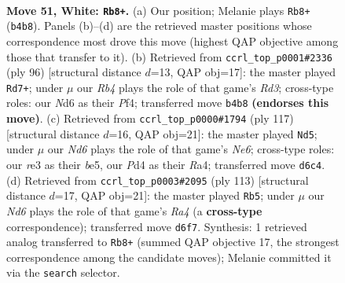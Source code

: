 \documentclass[11pt]{article}
\begin{document}
\clearpage

\begin{figure}[p]\centering
\begin{subfigure}{0.46\textwidth}\centering
\resizebox{\linewidth}{!}{%
\newchessgame
\chessboard[
  setfen={7k/6p1/3N1p2/5p1p/1R1P3P/4r1P1/6K1/8 w - - 0 51},
  showmover=false,
  pgfstyle=straightmove, color=movearrow, markmove={b4-b8}
]}
\caption{}
\end{subfigure}\hfill
\begin{subfigure}{0.46\textwidth}\centering
\resizebox{\linewidth}{!}{%
\newchessgame
\chessboard[
  setfen={8/7k/6p1/5p2/5P1p/3RP2P/r5P1/5K2 w - - 14 49},
  showmover=false,
  pgfstyle=straightmove, color=movearrow, markmove={d3-d7}
]}
\caption{}
\end{subfigure}
\\[4pt]
\begin{subfigure}{0.46\textwidth}\centering
\resizebox{\linewidth}{!}{%
\newchessgame
\chessboard[
  setfen={8/5k2/1R4p1/4B2p/r4p1P/4nP2/6PK/8 b - - 23 59},
  showmover=false,
  pgfstyle=straightmove, color=movearrow, markmove={e3-d5}
]}
\caption{}
\end{subfigure}\hfill
\begin{subfigure}{0.46\textwidth}\centering
\resizebox{\linewidth}{!}{%
\newchessgame
\chessboard[
  setfen={8/6k1/4R2p/r3p2p/4Pp2/5P2/6PK/8 b - - 7 57},
  showmover=false,
  pgfstyle=straightmove, color=movearrow, markmove={a5-b5}
]}
\caption{}
\end{subfigure}
\caption{\textbf{Move 51, White: \texttt{Rb8+}.} (a) Our position; Melanie plays \texttt{Rb8+} (\texttt{b4b8}). Panels (b)--(d) are the retrieved master positions whose correspondence most drove this move (highest QAP objective among those that transfer to it). (b) Retrieved from \texttt{ccrl\_top\_p0001\#2336} (ply 96) [structural distance $d$=13, QAP obj=17]: the master played \texttt{Rd7+}; under $\mu$ our \emph{Rb4} plays the role of that game's \emph{Rd3}; cross-type roles: our \emph{N}d6 as their \emph{P}f4; transferred move \texttt{b4b8} \textbf{(endorses this move)}. (c) Retrieved from \texttt{ccrl\_top\_p0000\#1794} (ply 117) [structural distance $d$=16, QAP obj=21]: the master played \texttt{Nd5}; under $\mu$ our \emph{Nd6} plays the role of that game's \emph{Ne6}; cross-type roles: our \emph{r}e3 as their \emph{b}e5, our \emph{P}d4 as their \emph{R}a4; transferred move \texttt{d6c4}. (d) Retrieved from \texttt{ccrl\_top\_p0003\#2095} (ply 113) [structural distance $d$=17, QAP obj=21]: the master played \texttt{Rb5}; under $\mu$ our \emph{Nd6} plays the role of that game's \emph{Ra4} (a \textbf{cross-type} correspondence); transferred move \texttt{d6f7}. Synthesis: 1 retrieved analog transferred to \texttt{Rb8+} (summed QAP objective 17, the strongest correspondence among the candidate moves); Melanie committed it via the \texttt{search} selector.}
\label{fig:thought-m100}
\end{figure}
\end{document}
